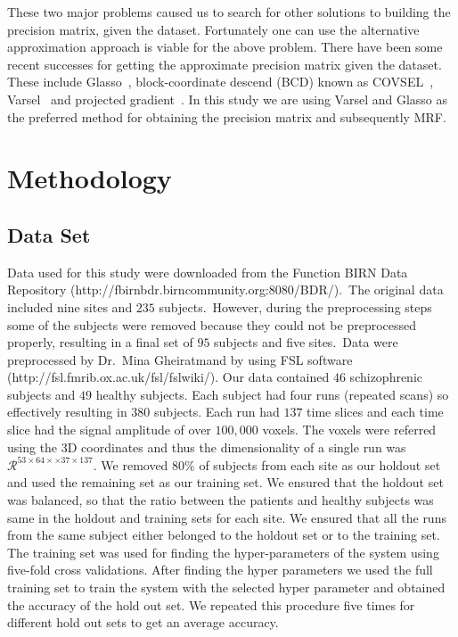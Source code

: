 \documentclass{article} %
\begin{document}
These two major problems caused us to search for other solutions to building the 
precision matrix, given the dataset. Fortunately one can use the alternative 
approximation approach is viable for the above problem. There have been some 
recent successes for getting the approximate precision matrix given the dataset. 
These include Glasso~\cite{glasso}, block-coordinate descend (BCD) known as 
COVSEL~\cite{Banerjee:2008:MST:1390681.1390696}, Varsel~\cite{honorio2009sparse} 
and projected gradient~\cite{lin2009learning}. 
In this study we are using Varsel and Glasso as 
the preferred method for obtaining the precision matrix and subsequently MRF.   


\section{Methodology}

\subsection{Data Set}
Data used for this study were downloaded from the Function BIRN Data 
Repository (http://fbirnbdr.birncommunity.org:8080/BDR/).\ The original 
data included nine sites and $235$ subjects.\ However, during the 
preprocessing steps some of the subjects were removed because they could
not be preprocessed properly, resulting in a final set of $95$ 
subjects and five sites.\ Data were preprocessed by Dr.\ Mina Gheiratmand by 
using FSL software (http://fsl.fmrib.ox.ac.uk/fsl/fslwiki/). Our data 
contained $46$ schizophrenic subjects and $49$ healthy subjects. Each subject 
had four runs (repeated scans) so effectively resulting in $380$ subjects. Each run had 
$137$ time slices and each time slice had the signal amplitude of over 
$100,000$ voxels. The voxels were referred using the 3D coordinates and thus 
the dimensionality of a single run was 
$\mathcal R^{ 53 \times 64 \times \times 37 \times 137}$.
We removed $80\%$ of subjects from each site as our holdout set and used the 
remaining set as our training set. We ensured that the holdout 
set was balanced, so that the ratio between the patients and healthy 
subjects was same in the holdout and training sets for each site. We ensured 
that all the runs from the same subject either belonged to the holdout 
set or to the training set. The training set was used for finding the 
hyper-parameters of the system using five-fold cross validations. After finding 
the hyper parameters we used the full training set to train the system with 
the selected hyper parameter and obtained the accuracy of the hold out set. 
We repeated this procedure five times for different hold out sets 
to get an average accuracy. 
\end{document}
